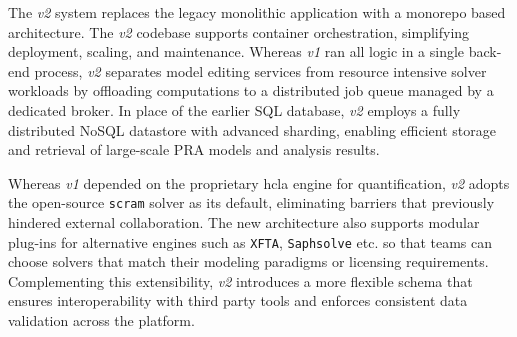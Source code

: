 \begin{comment}
The \textit{v2} update was driven by the need to improve openness, scalability, and solver flexibility. Three major goals encapsulate these objectives:
\begin{enumerate}
    \item \textbf{Architectural overhaul for extensibility and maintainability}, ensuring that new quantification methods or specialized back ends can be more easily integrated. 
    \item \textbf{Distributed computing and parallelization}, allowing a larger number of simultaneous analyses and more rigorous Monte Carlo sampling under high-throughput demands. 
    \item \textbf{Open-source licensing and community involvement}, encouraging collaboration from researchers and practitioners who can actively contribute domain-specific plug-ins or enhancements.
\end{enumerate}

\subsubsection{Architectural and Implementation Differences}
\subsubsection{Solver Integration and Model Exchange}
\subsubsection{Performance and Scalability Enhancements}
\end{comment}

The \textit{v2} system replaces the legacy monolithic application with a monorepo based architecture. The \textit{v2} codebase supports container orchestration, simplifying deployment, scaling, and maintenance. Whereas \textit{v1} ran all logic in a single back-end process, \textit{v2} separates model editing services from resource intensive solver workloads by offloading computations to a distributed job queue managed by a dedicated broker. In place of the earlier SQL database, \textit{v2} employs a fully distributed NoSQL datastore with advanced sharding, enabling efficient storage and retrieval of large-scale PRA models and analysis results.

Whereas \textit{v1} depended on the proprietary \acrshort{hcla} engine for quantification, \textit{v2} adopts the open-source \texttt{scram} solver as its default, eliminating barriers that previously hindered external collaboration. The new architecture also supports modular plug-ins for alternative engines such as \texttt{XFTA}, \texttt{Saphsolve} etc. so that teams can choose solvers that match their modeling paradigms or licensing requirements. Complementing this extensibility, \textit{v2} introduces a more flexible schema that ensures interoperability with third party tools and enforces consistent data validation across the platform.


